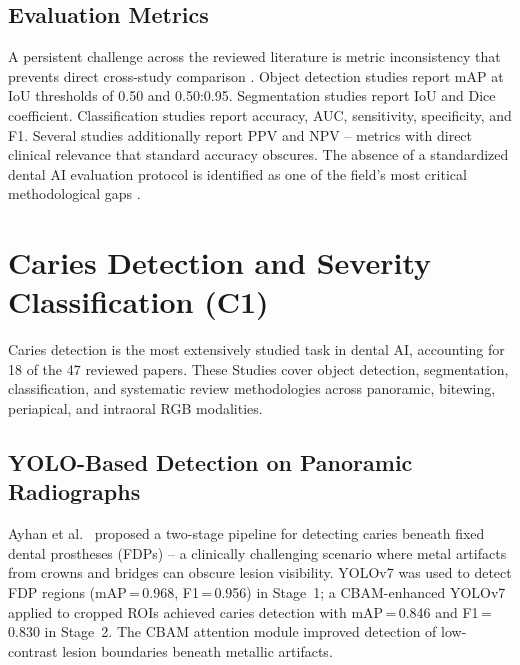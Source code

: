 \documentclass[conference]{IEEEtran}
\begin{document}
\subsection{Evaluation Metrics}

A persistent challenge across the reviewed literature is metric
inconsistency that prevents direct cross-study comparison
\cite{iacob2025automated,bonfanti2025deep,khubrani2025detection,zanini2024systematic}.
Object detection studies report mAP at IoU thresholds of 0.50 and
0.50:0.95. Segmentation studies report IoU and Dice coefficient.
Classification studies report accuracy, AUC, sensitivity, specificity,
and F1. Several studies \cite{chen2023deep,bilal2024pdcnet,zancan2025ai}
additionally report PPV and NPV -- metrics with direct clinical
relevance that standard accuracy obscures. The absence of a standardized
dental AI evaluation protocol is identified as one of the field's most
critical methodological gaps
\cite{iacob2025automated,luke2025accuracy,khubrani2025detection}.

\section{Caries Detection and Severity Classification (C1)}
\label{sec:caries}

Caries detection is the most extensively studied task in dental AI, accounting for 18 of the 47 reviewed papers.
These Studies cover object detection, segmentation, classification, and systematic review methodologies across panoramic, bitewing, periapical, and intraoral RGB modalities.


\subsection{YOLO-Based Detection on Panoramic Radiographs}

Ayhan et al.~\cite{ayhan2025detection} proposed a two-stage pipeline for detecting caries beneath fixed dental prostheses (FDPs) -- a clinically challenging scenario where metal artifacts from crowns and bridges can obscure lesion visibility. YOLOv7 was used to detect FDP regions
(mAP\,=\,0.968, F1\,=\,0.956) in Stage~1; a CBAM-enhanced YOLOv7
applied to cropped ROIs achieved caries detection with mAP\,=\,0.846
and F1\,=\,0.830 in Stage~2. The CBAM attention module improved detection of low-contrast lesion boundaries beneath metallic
artifacts.
\end{document}
